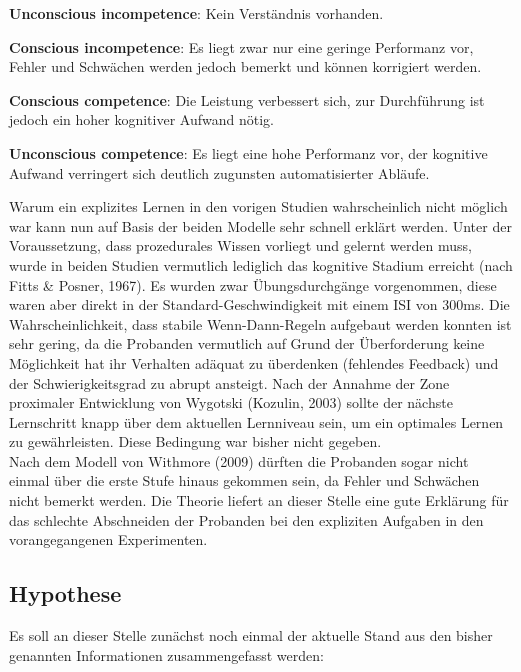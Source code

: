 \documentclass[doc,a4paper,12pt]{apa6}
\begin{document}
\begin{compactenum}
  \item \textbf{Unconscious incompetence}: Kein Verständnis vorhanden.
  \item \textbf{Conscious incompetence}: Es liegt zwar nur eine geringe Performanz vor, Fehler und Schwächen werden jedoch bemerkt und können korrigiert werden.
  \item \textbf{Conscious competence}: Die Leistung verbessert sich, zur Durchführung ist jedoch ein hoher kognitiver Aufwand nötig.
  \item \textbf{Unconscious competence}: Es liegt eine hohe Performanz vor, der kognitive Aufwand verringert sich deutlich zugunsten automatisierter Abläufe.
\end{compactenum}

Warum ein explizites Lernen in den vorigen Studien wahrscheinlich nicht möglich war kann nun auf Basis der beiden Modelle sehr schnell erklärt werden. Unter der Voraussetzung, dass prozedurales Wissen vorliegt und gelernt werden muss, wurde in beiden Studien vermutlich lediglich das kognitive Stadium erreicht (nach Fitts \& Posner, 1967). Es wurden zwar Übungsdurchgänge vorgenommen, diese waren aber direkt in der Standard-Geschwindigkeit mit einem ISI von 300ms. Die Wahrscheinlichkeit, dass stabile Wenn-Dann-Regeln aufgebaut werden konnten ist sehr gering, da die Probanden vermutlich auf Grund der Überforderung keine Möglichkeit hat ihr Verhalten adäquat zu überdenken (fehlendes Feedback) und der Schwierigkeitsgrad zu abrupt ansteigt. Nach der Annahme der Zone proximaler Entwicklung von Wygotski (Kozulin, 2003) sollte der nächste Lernschritt knapp über dem aktuellen Lernniveau sein, um ein optimales Lernen zu gewährleisten. Diese Bedingung war bisher nicht gegeben.\\
Nach dem Modell von Withmore (2009) dürften die Probanden sogar nicht einmal über die erste Stufe hinaus gekommen sein, da Fehler und Schwächen nicht bemerkt werden. Die Theorie liefert an dieser Stelle eine gute Erklärung für das schlechte Abschneiden der Probanden bei den expliziten Aufgaben in den vorangegangenen Experimenten.

\subsection{Hypothese}

Es soll an dieser Stelle zunächst noch einmal der aktuelle Stand aus den bisher genannten Informationen zusammengefasst werden:
\end{document}
